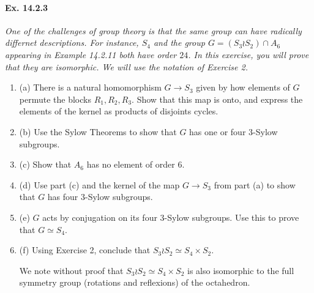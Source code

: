 \documentclass[11pt,a4paper]{article}
\newcommand{\be} {\begin{enumerate}}
\newcommand{\ee} {\end{enumerate}}
\begin{document}
\paragraph{Ex. 14.2.3}
{\it One of the challenges of group theory is that the same group can have radically differnet descriptions. For instance, $S_4$ and the group $G = (S_3 \wr S_2) \cap A_6$ appearing in Example 14.2.11 both have order $24$. In this exercise, you will prove that they are isomorphic. We will use the notation of Exercise 2.
\be
\item[(a)] There is a natural homomorphism $G \to S_3$ given by how elements of $G$ permute the blocks $R_1,R_2,R_3$. Show that this map is onto, and express the elements of the kernel as products of disjoints cycles.
\item[(b)] Use the Sylow Theorems to show that $G$ has one or four $3$-Sylow subgroups.
\item[(c)] Show that $A_6$ has no element of order $6$.
\item[(d)] Use part (c) and the kernel of the map $G \to S_3$ from part (a) to show that $G$ has four $3$-Sylow subgroups.
\item[(e)] $G$ acts by conjugation on its four $3$-Sylow subgroups. Use this to prove that $G \simeq S_4$.
\item[(f)] Using Exercise 2, conclude that $S_3 \wr S_2 \simeq S_4 \times S_2$.

We note without proof that $S_3 \wr S_2 \simeq S_4 \times S_2$ is also isomorphic to the full symmetry group (rotations and reflexions) of the octahedron.
\ee
}
\end{document}
